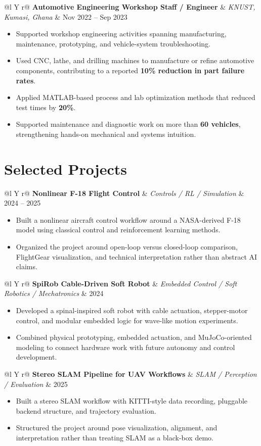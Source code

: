 \documentclass[10pt,letterpaper]{article}
\makeatletter
\newenvironment{role}[4]
{
\begin{tabularx}{\textwidth}{@{}l Y r@{}}
\textbf{#1} & \textit{#2, #3} & #4
\end{tabularx}
\vspace{-0.45em}
\begin{itemize}[leftmargin=1.2em, itemsep=0.18em, topsep=0.2em]
}
{
\end{itemize}
\vspace{0.15em}
}
\newenvironment{project}[3]
{
\begin{tabularx}{\textwidth}{@{}l Y r@{}}
\textbf{#1} & \textit{#2} & #3
\end{tabularx}
\vspace{-0.45em}
\begin{itemize}[leftmargin=1.2em, itemsep=0.18em, topsep=0.2em]
}
{
\end{itemize}
\vspace{0.15em}
}
\makeatother
\begin{document}
\begin{role}
{Automotive Engineering Workshop Staff / Engineer}
{KNUST}
{Kumasi, Ghana}
{Nov 2022 -- Sep 2023}
    \item Supported workshop engineering activities spanning manufacturing, maintenance, prototyping, and vehicle-system troubleshooting.
    \item Used CNC, lathe, and drilling machines to manufacture or refine automotive components, contributing to a reported \textbf{10\% reduction in part failure rates}.
    \item Applied MATLAB-based process and lab optimization methods that reduced test times by \textbf{20\%}.
    \item Supported maintenance and diagnostic work on more than \textbf{60 vehicles}, strengthening hands-on mechanical and systems intuition.
\end{role}

\section{Selected Projects}

\begin{project}
{Nonlinear F-18 Flight Control}
{Controls / RL / Simulation}
{2024 -- 2025}
    \item Built a nonlinear aircraft control workflow around a NASA-derived F-18 model using classical control and reinforcement learning methods.
    \item Organized the project around open-loop versus closed-loop comparison, FlightGear visualization, and technical interpretation rather than abstract AI claims.
\end{project}

\begin{project}
{SpiRob Cable-Driven Soft Robot}
{Embedded Control / Soft Robotics / Mechatronics}
{2024}
    \item Developed a spinal-inspired soft robot with cable actuation, stepper-motor control, and modular embedded logic for wave-like motion experiments.
    \item Combined physical prototyping, embedded actuation, and MuJoCo-oriented modeling to connect hardware work with future autonomy and control development.
\end{project}

\begin{project}
{Stereo SLAM Pipeline for UAV Workflows}
{SLAM / Perception / Evaluation}
{2025}
    \item Built a stereo SLAM workflow with KITTI-style data recording, pluggable backend structure, and trajectory evaluation.
    \item Structured the project around pose visualization, alignment, and interpretation rather than treating SLAM as a black-box demo.
\end{project}
\end{document}
